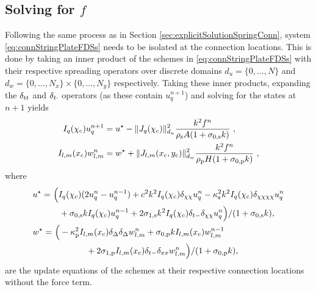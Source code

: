 \subsection{Solving for $f$}
Following the same process as in Section \ref{sec:explicitSolutionSpringConn}, system \eqref{eq:connStringPlateFDSs} needs to be isolated at the connection locations. This is done by taking an inner product of the schemes in \eqref{eq:connStringPlateFDSs} with their respective spreading operators over discrete domains $d_u = \{0, \hdots, N\}$ and $d_w = \{0, \hdots, N_x\}\times \{0, \hdots, N_y\}$ respectively. Taking these inner products, expanding the $\delta_{tt}$ and $\delta_{t\cdot}$ operators (as these contain $u_q^{n+1}$) and solving for the states at $n+1$ yields
\begin{subequations}\label{eq:connStringPlateFDSsAtConn}
    \begin{align}
        \Iq u_q^{n+1} &= u^\star- \lVert J_q(\chi_\ctxt)\rVert_{d_u}^2\frac{k^2f^n}{\rho_\stxt A(1+\szX[\stxt]k)}\ ,\\
        \Ilm w_{l,m}^n &= w^\star+ \lVert J_{l, m}(x_\ctxt, y_\ctxt)\rVert_{d_w}^2\frac{k^2f^n}{\rho_\ptxt H(1+\szX[\ptxt]k)}\ ,
    \end{align}
\end{subequations}
where
\begin{subequations}
\begin{align}
    &\begin{aligned}
        u^{\star} =&\ \Big(\Iq (2\uqn - u_q^{n-1}) + c^2k^2 \Iq\dcc \uqn - \kappa_\stxt^2k^2 \Iq\dcccc \uqn\\
        &\quad+ \szX[\stxt]k\Iq u_q^{n-1} + 2\soX[\stxt]k^2 \Iq\dtm\dcc \uqn\Big) / (1+\szX[\stxt]k),
    \end{aligned}\label{eq:stringPlateUStar}\\
    &\begin{aligned}
        w^\star =&\ \Big(-\kappa_\ptxt^2\Ilm\dDelta\dDelta \wlmn + \szX[\ptxt]k\Ilm w_{l,m}^{n-1} \\
        &\qquad\qquad+ 2\soX[\ptxt] \Ilm\dtm\dxx \wlmn\Big)/(1+\szX[\ptxt]k),
    \end{aligned}\label{eq:stringPlateWStar}
\end{align}
\end{subequations}
are the update equations of the schemes at their respective connection locations without the force term. 

